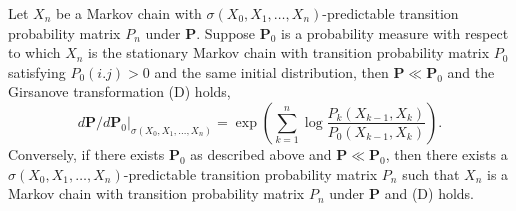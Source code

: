\documentclass[10pt,a4paper]{amsart}
\begin{document}
\begin{theorem}
    Let $X_{n}$ be a Markov chain with $\sigma(X_{0},X_{1},\dots, X_{n})$-predictable transition probability matrix $P_n$ under $\mathbf P$. Suppose $\mathbf{P}_{0}$ is a probability measure with respect to which $X_{n}$ is the stationary Markov chain with transition probability matrix $P_0$ satisfying $P_{0}(i.j) >0$ and the same initial distribution, then $\mathbf{P} \ll \mathbf{P}_{0}$ and the Girsanove transformation (D) holds,
    \begin{equation*}   \left.d\mathbf{P}/d\mathbf{P}_{0}\right|_{\sigma(X_{0},X_{1},\dots, X_{n})}=  %
    \exp\left(\sum_{k=1}^{n} \log \frac{P_{k}(X_{k-1},X_{k})}{P_{0}(X_{k-1},X_{k})}
    \right). \tag{D}    \end{equation*}
    Conversely, if there exists $\mathbf{P}_{0}$ as described above and $\mathbf{P}\ll \mathbf{P}_{0}$, then there exists a $\sigma(X_{0},X_{1},\dots,X_{n})$-predictable transition probability matrix $P_n$ such that $X_n$ is a Markov chain with transition probability matrix $P_n$ under $\mathbf P$ and (D) holds. 
\end{theorem}
\end{document}
